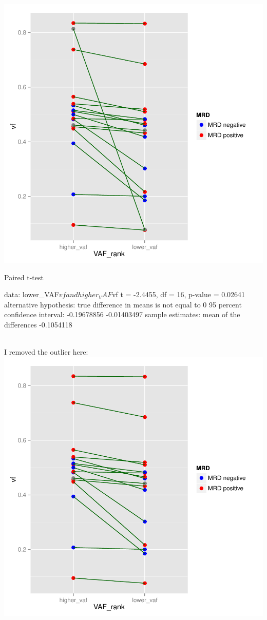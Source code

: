 \documentclass[a4paper,11pt]{article}
\begin{document}
\includegraphics{ATM_VAF-011}
\begin{Schunk}
\begin{Soutput}
	Paired t-test

data:  lower_VAF$vf and higher_VAF$vf
t = -2.4455, df = 16, p-value = 0.02641
alternative hypothesis: true difference in means is not equal to 0
95 percent confidence interval:
 -0.19678856 -0.01403497
sample estimates:
mean of the differences 
             -0.1054118 
\end{Soutput}
\end{Schunk}
\\I removed the outlier here:\\
\includegraphics{ATM_VAF-014}
\end{document}
